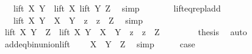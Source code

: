 \begin{isabellebody}
\ {\isachardoublequoteopen}{\isachardot}{\kern0pt}{\isachardot}{\kern0pt}{\isachardot}{\kern0pt}\ {\isacharequal}{\kern0pt}\ {\isacharparenleft}{\kern0pt}lift\ X\ Y{\isacharparenright}{\kern0pt}\ {\isasymunion}\ lift\ X\ {\isacharparenleft}{\kern0pt}lift\ Y\ Z{\isacharparenright}{\kern0pt}{\isachardoublequoteclose}\ \isamarkupfalse%
\ simp\isanewline
\ \ \ \ \isamarkupfalse%
\ \isamarkupfalse%
\ lift{\isacharunderscore}{\kern0pt}eq{\isacharunderscore}{\kern0pt}repl{\isacharunderscore}{\kern0pt}add\ \isamarkupfalse%
\ {\isachardoublequoteopen}{\isachardot}{\kern0pt}{\isachardot}{\kern0pt}{\isachardot}{\kern0pt}\ {\isacharequal}{\kern0pt}\ {\isacharparenleft}{\kern0pt}lift\ X\ Y{\isacharparenright}{\kern0pt}\ {\isasymunion}\ {\isacharbraceleft}{\kern0pt}X\ {\isacharplus}{\kern0pt}\ {\isacharparenleft}{\kern0pt}Y\ {\isacharplus}{\kern0pt}\ z{\isacharparenright}{\kern0pt}\ {\isacharbar}{\kern0pt}\ z\ {\isasymin}\ Z{\isacharbraceright}{\kern0pt}{\isachardoublequoteclose}\ \isamarkupfalse%
\ simp\isanewline
\ \ \ \ \isamarkupfalse%
\ \isamarkupfalse%
\ {\isachardoublequoteopen}lift\ X\ {\isacharparenleft}{\kern0pt}Y\ {\isacharplus}{\kern0pt}\ Z{\isacharparenright}{\kern0pt}\ {\isacharequal}{\kern0pt}\ {\isacharparenleft}{\kern0pt}lift\ X\ Y{\isacharparenright}{\kern0pt}\ {\isasymunion}\ {\isacharbraceleft}{\kern0pt}X\ {\isacharplus}{\kern0pt}\ {\isacharparenleft}{\kern0pt}Y\ {\isacharplus}{\kern0pt}\ z{\isacharparenright}{\kern0pt}\ {\isacharbar}{\kern0pt}\ z\ {\isasymin}\ Z{\isacharbraceright}{\kern0pt}{\isachardoublequoteclose}\ \isacommand{{\isachardot}{\kern0pt}}\isamarkupfalse%
\isanewline
\ \ \ \ \isamarkupfalse%
\ \isamarkupfalse%
\ {\isacharquery}{\kern0pt}thesis\ \isamarkupfalse%
\ auto\isanewline
\ \ \isamarkupfalse%
\isanewline
\ \ \isamarkupfalse%
\ \isamarkupfalse%
\ add{\isacharunderscore}{\kern0pt}eq{\isacharunderscore}{\kern0pt}bin{\isacharunderscore}{\kern0pt}union{\isacharunderscore}{\kern0pt}lift\ \isamarkupfalse%
\ {\isachardoublequoteopen}{\isachardot}{\kern0pt}{\isachardot}{\kern0pt}{\isachardot}{\kern0pt}\ {\isacharequal}{\kern0pt}\ X\ {\isacharplus}{\kern0pt}\ {\isacharparenleft}{\kern0pt}Y\ {\isacharplus}{\kern0pt}\ Z{\isacharparenright}{\kern0pt}{\isachardoublequoteclose}\ \isamarkupfalse%
\ simp\isanewline
\ \ \isamarkupfalse%
\ \isamarkupfalse%
\ {\isacharquery}{\kern0pt}case\ \isacommand{{\isachardot}{\kern0pt}}\isamarkupfalse%

\end{isabellebody}
